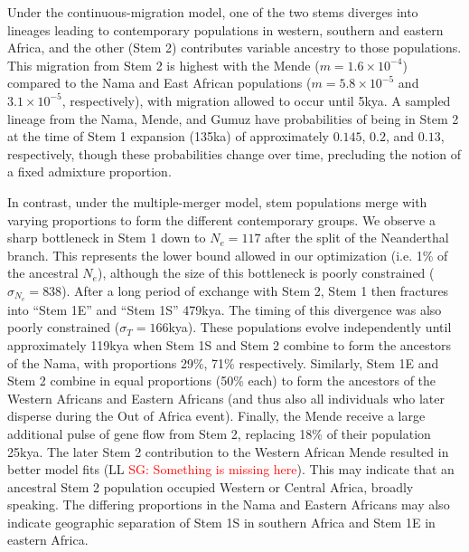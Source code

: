 \documentclass[]{article}
\newcommand{\sgcomment}[1]{{\textcolor{red}{SG: #1}}}
\begin{document}
Under the continuous-migration model, one of the two stems diverges into
lineages leading to contemporary populations in western, southern and eastern
Africa, and the other (Stem 2) contributes variable ancestry to those
populations. This migration from Stem 2 is highest with the Mende
($m=1.6\times10^{-4}$) compared to the Nama and East African populations
($m=5.8\times10^{-5}$ and $3.1\times10^{-5}$, respectively), with migration
allowed to occur until 5kya. A
sampled lineage from the Nama, Mende, and Gumuz have probabilities of being in
Stem 2 at the time of Stem 1 expansion (135ka) of approximately $0.145$, $0.2$,
and $0.13$, respectively, though these probabilities change over time,
precluding the notion of a fixed admixture proportion.

In contrast, under the multiple-merger model, stem populations merge with
varying proportions to form the different contemporary groups. 
We observe a sharp bottleneck in Stem 1 down to $N_e=117$ after the split of
the Neanderthal branch. This represents the lower bound allowed in our
optimization (i.e. 1\% of the ancestral $N_e$), although the size of this
bottleneck is poorly constrained ($\sigma_{N_e}=838$). After a long period of
exchange with Stem 2, Stem 1 then fractures into “Stem 1E” and “Stem 1S”
479kya. The timing of this divergence was also poorly constrained ($\sigma_T=
166$kya). These populations evolve independently until approximately 119kya
when Stem 1S and Stem 2 combine to form the ancestors of the Nama, with
proportions 29\%, 71\% respectively. Similarly, Stem 1E and Stem 2 combine in
equal proportions (50\% each) to form the ancestors of the Western Africans and
Eastern Africans (and thus also all individuals who later disperse during the
Out of Africa event). Finally, the Mende receive a large additional pulse of
gene flow from Stem 2, replacing 18\% of their population 25kya. The later Stem
2 contribution to the Western African Mende resulted in better model fits (LL \sgcomment{Something is missing here}).
This may indicate that an ancestral Stem 2 population occupied Western or
Central Africa, broadly speaking. The differing proportions in the Nama and
Eastern Africans may also indicate geographic separation of Stem 1S in southern
Africa and Stem 1E in eastern Africa. 
\end{document}
